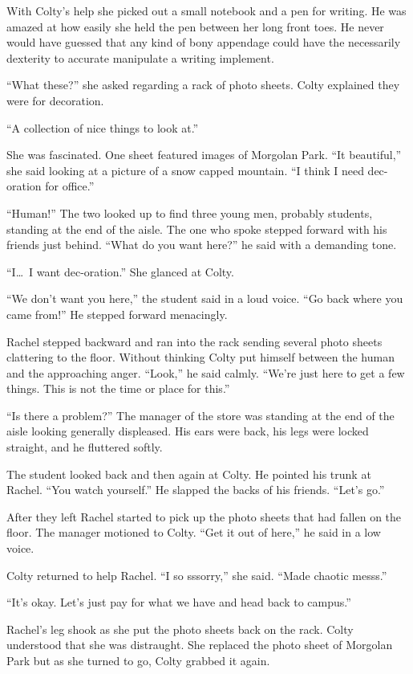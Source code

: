With Colty's help she picked out a small notebook and a pen for writing. He was amazed at how
easily she held the pen between her long front toes. He never would have guessed that any kind
of bony appendage could have the necessarily dexterity to accurate manipulate a writing
implement.

``What these?'' she asked regarding a rack of photo sheets. Colty explained they were for
decoration.

``A collection of nice things to look at.''

She was fascinated. One sheet featured images of Morgolan Park. ``It beautiful,'' she said
looking at a picture of a snow capped mountain. ``I think I need dec-oration for office.''

``Human!'' The two looked up to find three young men, probably students, standing at the end of
the aisle. The one who spoke stepped forward with his friends just behind. ``What do you want
here?'' he said with a demanding tone.

``I\ldots\ I want dec-oration.'' She glanced at Colty.

``We don't want you here,'' the student said in a loud voice. ``Go back where you came from!''
He stepped forward menacingly.

Rachel stepped backward and ran into the rack sending several photo sheets clattering to the
floor. Without thinking Colty put himself between the human and the approaching anger. ``Look,''
he said calmly. ``We're just here to get a few things. This is not the time or place for this.''

``Is there a problem?'' The manager of the store was standing at the end of the aisle looking
generally displeased. His ears were back, his legs were locked straight, and he fluttered
softly.

The student looked back and then again at Colty. He pointed his trunk at Rachel. ``You watch
yourself.'' He slapped the backs of his friends. ``Let's go.''

After they left Rachel started to pick up the photo sheets that had fallen on the floor. The
manager motioned to Colty. ``Get it out of here,'' he said in a low voice.

Colty returned to help Rachel. ``I so sssorry,'' she said. ``Made chaotic messs.''

``It's okay. Let's just pay for what we have and head back to campus.''

Rachel's leg shook as she put the photo sheets back on the rack. Colty understood that she was
distraught. She replaced the photo sheet of Morgolan Park but as she turned to go, Colty grabbed
it again.

